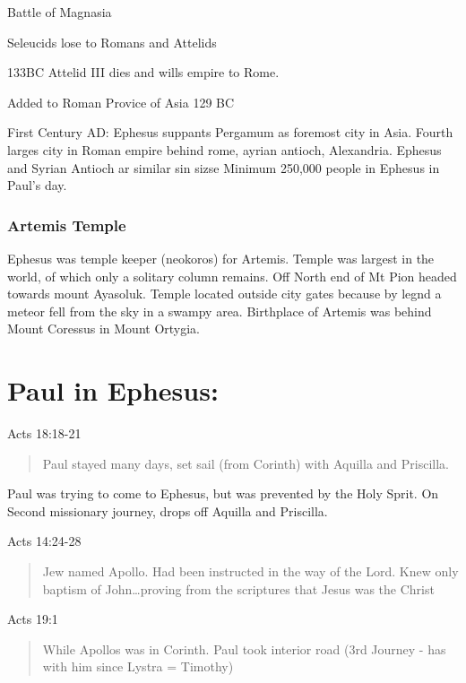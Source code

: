 \documentclass[
]{book}
\begin{document}
Battle of Magnasia

Seleucids lose to Romans and Attelids

133BC Attelid III dies and wills empire to Rome.

Added to Roman Provice of Asia 129 BC

First Century AD: Ephesus suppants Pergamum as foremost city in Asia. Fourth larges city in Roman empire behind rome, ayrian antioch, Alexandria. Ephesus and Syrian Antioch ar similar sin sizse Minimum 250,000 people in Ephesus in Paul's day.

\hypertarget{artemis-temple}{%
\subsubsection{Artemis Temple}\label{artemis-temple}}

Ephesus was temple keeper (neokoros) for Artemis. Temple was largest in the world, of which only a solitary column remains. Off North end of Mt Pion headed towards mount Ayasoluk. Temple located outside city gates because by legnd a meteor fell from the sky in a swampy area. Birthplace of Artemis was behind Mount Coressus in Mount Ortygia.

\hypertarget{paul-in-ephesus}{%
\section{Paul in Ephesus:}\label{paul-in-ephesus}}

Acts 18:18-21

\begin{quote}
Paul stayed many days, set sail (from Corinth) with Aquilla and Priscilla.
\end{quote}

Paul was trying to come to Ephesus, but was prevented by the Holy Sprit. On Second missionary journey, drops off Aquilla and Priscilla.

Acts 14:24-28

\begin{quote}
Jew named Apollo. Had been instructed in the way of the Lord. Knew only baptism of John\ldots proving from the scriptures that Jesus was the Christ
\end{quote}

Acts 19:1

\begin{quote}
While Apollos was in Corinth. Paul took interior road (3rd Journey - has with him since Lystra = Timothy)
\end{quote}
\end{document}
